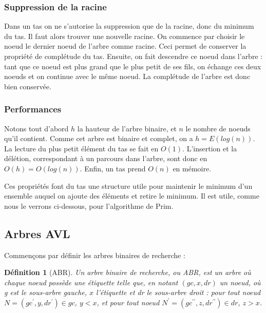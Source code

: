 \documentclass{article}
\newtheorem*{ddef}{Définition}
\begin{document}
\subsubsection{Suppression de la racine}
Dans un tas on ne s'autorise la suppression que de la racine, donc du minimum du tas. Il faut alors trouver une nouvelle racine. On commence par choisir le noeud le 
dernier noeud de l'arbre comme racine. Ceci permet de conserver la propriété de complétude du tas. Ensuite, on fait descendre ce noeud dans l'arbre : tant que ce noeud
est plus grand que le plus petit de ses fils, on échange ces deux noeuds et on continue avec le même noeud. La complétude de l'arbre est donc bien conservée.

\subsubsection{Performances}
Notons tout d'abord $h$ la hauteur de l'arbre binaire, et $n$ le nombre de noeuds qu'il contient. Comme cet arbre est binaire et complet, on a $h = E(log(n))$.
La lecture du plus petit élément du tas se fait en $O(1)$.
L'insertion et la délétion, correspondant à un parcours dans l'arbre, sont donc en $O(h) = O(log(n))$.
Enfin, un tas prend $O(n)$ en mémoire.


Ces propriétés font du tas une structure utile pour maintenir le minimum d'un ensemble auquel on ajoute des éléments et retire le minimum. Il est utile, comme nous le
verrons ci-dessous, pour l'algorithme de Prim.

\subsection{Arbres AVL}

Commençons par définir les arbres binaires de recherche :
\begin{ddef}[ABR]
Un arbre binaire de recherche, ou ABR, est un arbre où chaque noeud possède une étiquette telle que, en notant $(gc, x, dr)$ un noeud, où g est le sous-arbre gauche, $x$ l'étiquette et dr le sous-arbre droit : pour tout noeud $N = (gc^{\prime},y,dr^{\prime}) \in gc$, $y < x$, et
pour tout noeud $N^{\prime}=(gc^{\prime\prime},z,dr^{\prime\prime}) \in dr$, $z > x$.
\end{ddef}
\end{document}

